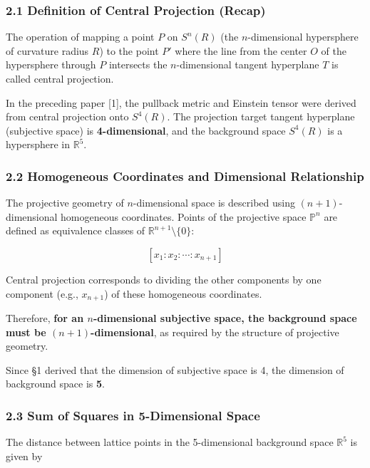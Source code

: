 \documentclass[a4paper,11pt]{article}
\begin{document}
\subsubsection{2.1 Definition of Central Projection
(Recap)}\label{definition-of-central-projection-recap}

The operation of mapping a point \(P\) on \(S^n(R)\) (the
\(n\)-dimensional hypersphere of curvature radius \(R\)) to the point
\(P'\) where the line from the center \(O\) of the hypersphere through
\(P\) intersects the \(n\)-dimensional tangent hyperplane \(T\) is
called central projection.

In the preceding paper {[}1{]}, the pullback metric and Einstein tensor
were derived from central projection onto \(S^4(R)\). The projection
target tangent hyperplane (subjective space) is \textbf{4-dimensional},
and the background space \(S^4(R)\) is a hypersphere in
\(\mathbb{R}^5\).

\subsubsection{2.2 Homogeneous Coordinates and Dimensional
Relationship}\label{homogeneous-coordinates-and-dimensional-relationship}

The projective geometry of \(n\)-dimensional space is described using
\((n+1)\)-dimensional homogeneous coordinates. Points of the projective
space \(\mathbb{P}^n\) are defined as equivalence classes of
\(\mathbb{R}^{n+1} \setminus \{0\}\):

\[[x_1 : x_2 : \cdots : x_{n+1}]\]

Central projection corresponds to dividing the other components by one
component (e.g., \(x_{n+1}\)) of these homogeneous coordinates.

Therefore, \textbf{for an \(n\)-dimensional subjective space, the
background space must be \((n+1)\)-dimensional}, as required by the
structure of projective geometry.

Since §1 derived that the dimension of subjective space is 4, the
dimension of background space is \textbf{5}.

\subsubsection{2.3 Sum of Squares in 5-Dimensional
Space}\label{sum-of-squares-in-5-dimensional-space}

The distance between lattice points in the 5-dimensional background
space \(\mathbb{R}^5\) is given by
\end{document}
